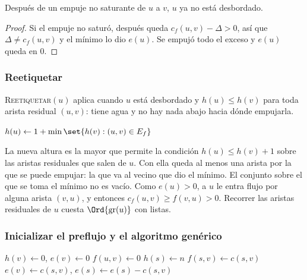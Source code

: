 \documentclass[11pt,letterpaper]{article}
\begin{document}
\begin{lema}
  \label{lem:push-no-saturante}
  Después de un empuje no saturante de $u$ a $v$, $u$ ya no está
  desbordado.
\end{lema}

\begin{proof}
  Si el empuje no saturó, después queda $c_f(u, v) - \Delta > 0$, así
  que $\Delta \neq c_f(u, v)$ y el mínimo lo dio $e(u)$. Se empujó
  todo el exceso y $e(u)$ queda en $0$.
\end{proof}

\subsubsection*{Reetiquetar}

\textsc{Reetiquetar}$(u)$ aplica cuando $u$ está desbordado y
$h(u) \le h(v)$ para toda arista residual $(u, v)$: tiene agua y no
hay nada abajo hacia dónde empujarla.

\begin{algorithm}[H]
\caption{\textsc{Reetiquetar}$(u)$ \ (\textsc{Relabel} en Cormen)}
\label{alg:reetiquetar}
\begin{algorithmic}[1]
  \State $h(u) \gets 1 + \min\set{h(v) : (u, v) \in E_f}$
\EndProcedure
\end{algorithmic}
\end{algorithm}

La nueva altura es la mayor que permite la condición
$h(u) \le h(v) + 1$ sobre las aristas residuales que salen de $u$. Con
ella queda al menos una arista por la que se puede empujar: la que va
al vecino que dio el mínimo. El conjunto sobre el que se toma el
mínimo no es vacío. Como $e(u) > 0$, a $u$ le entra flujo por alguna
arista $(v, u)$, y entonces $c_f(u, v) \ge f(v, u) > 0$. Recorrer las
aristas residuales de $u$ cuesta $\Ord{\text{gr}(u)}$ con listas.

\subsubsection*{Inicializar el preflujo y el algoritmo genérico}

\begin{algorithm}[H]
\caption{\textsc{Inicializar-Preflujo}$(G, s)$}
\label{alg:inicializar-preflujo}
\begin{algorithmic}[1]
    \State $h(v) \gets 0$, \quad $e(v) \gets 0$
  \EndFor
    \State $f(u, v) \gets 0$
  \EndFor
  \State $h(s) \gets n$
    \State $f(s, v) \gets c(s, v)$ 
    \State $e(v) \gets c(s, v)$, \quad $e(s) \gets e(s) - c(s, v)$
  \EndFor
\EndProcedure
\end{algorithmic}
\end{algorithm}
\end{document}
